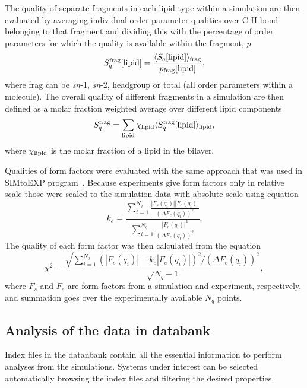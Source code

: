\documentclass[fleqn,10pt]{wlscirep}
\begin{document}
The quality of separate fragments in each lipid type within a simulation are then evaluated by averaging individual order parameter qualities over C-H bond belonging to that fragment and dividing this with the percentage of order parameters for which the quality is available within the fragment, $p$
\begin{equation}
    S_q^{\rm frag}[{\rm lipid}] = \frac{\langle S_q[{\rm lipid}]\rangle_{\rm frag}}{p_{\rm frag}[{\rm lipid}]},
\end{equation}
 where frag can be {\it sn}-1, {\it sn}-2, headgroup or total (all order parameters within a molecule). The overall quality of different fragments in a simulation are then defined as a molar fraction weighted average over different lipid components
\begin{equation}
    S_q^{\rm frag} = \sum_{\rm lipid} \chi_{\rm lipid} \langle S_q^{\rm frag}[{\rm lipid}]\rangle_{\rm lipid} ,
\end{equation}
where $\chi_{\rm lipid}$ is the molar fraction of a lipid in the bilayer.

Qualities of form factors were evaluated with the same approach that was used in SIMtoEXP program~\cite{kucerka10}. Because experiments give form factors only in relative scale those were scaled to the simulation data with absolute scale using equation
\begin{equation}
    k_e = \frac{\sum_{i=1}^{N_q} \frac{|F_s(q_i)||F_e(q_i)|}{(\Delta F_e(q_i))^2}}{\sum_{i=1}^{N_q} \frac{|F_e(q_i)|^2}{(\Delta F_e(q_i))^2}}.
\end{equation}
The quality of each form factor was then calculated from the equation
\begin{equation}
    \chi^2 = \frac{\sqrt{\sum_{i=1}^{N_q}(|F_s(q_i)|-k_e|F_e(q_i)|)^2/(\Delta F_e(q_i))^2}}{\sqrt{N_q-1}},
\end{equation}
where $F_s$ and $F_e$ are form factors from a simulation and experiment, respectively, and summation goes over the experimentally available $N_q$ points. 



\subsection{Analysis of the data in databank}

Index files in the datanbank contain all the essential information to perform analyses from the simulations. Systems under interest can be selected automatically browsing the index files and filtering the desired properties. 
\end{document}
